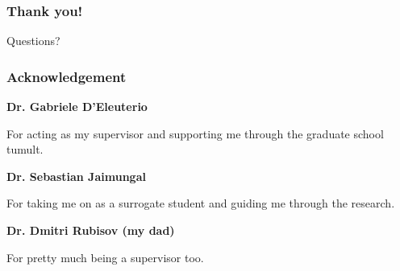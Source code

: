 {
\makeatletter {} \makeatother
\begin{frame}[noframenumbering]
\frametitle{Thank you!}

\begin{center}
Questions?
\end{center}

\end{frame}
}

{
\makeatletter {} \makeatother
\begin{frame}[noframenumbering]
\frametitle{Acknowledgement}
{\bf Dr. Gabriele D'Eleuterio \par}
For acting as my supervisor and supporting me through the graduate school tumult.\par 
\vspace{\baselineskip}
{\bf Dr. Sebastian Jaimungal \par}
For taking me on as a surrogate student and guiding me through the research.\par 
\vspace{\baselineskip}
{\bf Dr. Dmitri Rubisov (my dad) \par} 
For pretty much being a supervisor too.

\end{frame}
}